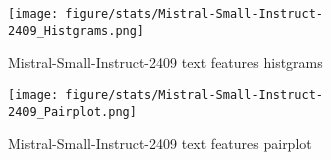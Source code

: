 \begin{figure}[H]
    \centering
    \texttt{[image: figure/stats/Mistral-Small-Instruct-2409\_Histgrams.png]}
    \caption{Mistral-Small-Instruct-2409 text features histgrams}
    \label{fig:human_hist}
\end{figure}


\begin{figure}[H]
    \centering
    \texttt{[image: figure/stats/Mistral-Small-Instruct-2409\_Pairplot.png]}
    \caption{Mistral-Small-Instruct-2409 text features pairplot}
    \label{fig:human_pairplot}
\end{figure}
